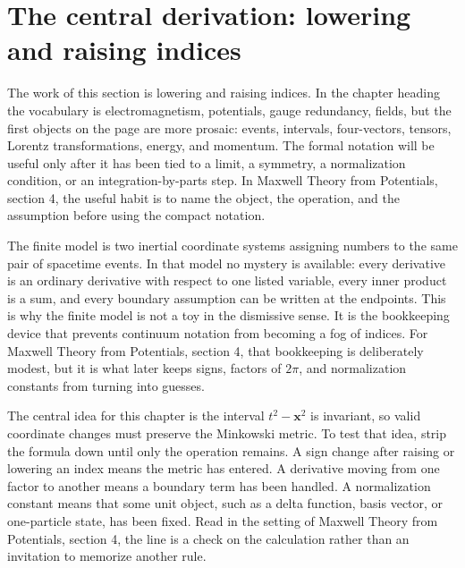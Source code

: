 \section{The central derivation: lowering and raising indices}













The work of this section is lowering and raising indices.  In the chapter heading the vocabulary is electromagnetism, potentials, gauge redundancy, fields, but the first objects on the page are more prosaic: events, intervals, four-vectors, tensors, Lorentz transformations, energy, and momentum.  The formal notation will be useful only after it has been tied to a limit, a symmetry, a normalization condition, or an integration-by-parts step.  In Maxwell Theory from Potentials, section 4, the useful habit is to name the object, the operation, and the assumption before using the compact notation.

The finite model is two inertial coordinate systems assigning numbers to the same pair of spacetime events.  In that model no mystery is available: every derivative is an ordinary derivative with respect to one listed variable, every inner product is a sum, and every boundary assumption can be written at the endpoints.  This is why the finite model is not a toy in the dismissive sense.  It is the bookkeeping device that prevents continuum notation from becoming a fog of indices.  For Maxwell Theory from Potentials, section 4, that bookkeeping is deliberately modest, but it is what later keeps signs, factors of \(2\pi\), and normalization constants from turning into guesses.

The central idea for this chapter is the interval \(t^2-\bm x^2\) is invariant, so valid coordinate changes must preserve the Minkowski metric.  To test that idea, strip the formula down until only the operation remains.  A sign change after raising or lowering an index means the metric has entered.  A derivative moving from one factor to another means a boundary term has been handled.  A normalization constant means that some unit object, such as a delta function, basis vector, or one-particle state, has been fixed.  Read in the setting of Maxwell Theory from Potentials, section 4, the line is a check on the calculation rather than an invitation to memorize another rule.

